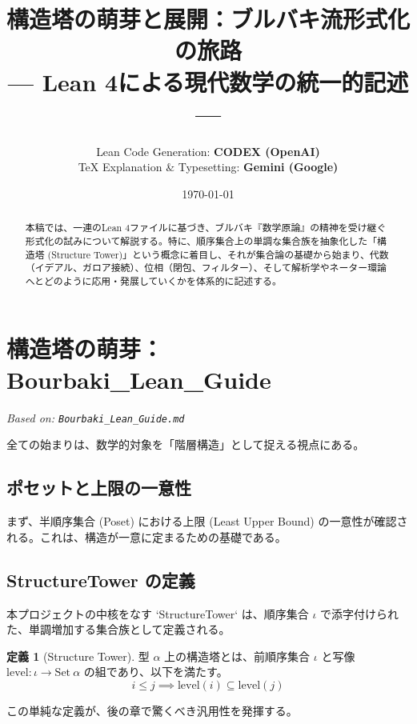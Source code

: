 \documentclass[a4paper,11pt]{ltjsarticle}
\title{\textbf{構造塔の萌芽と展開：ブルバキ流形式化の旅路} \\ \large --- Lean 4による現代数学の統一的記述 ---}
\author{
    Lean Code Generation: \textbf{CODEX (OpenAI)} \\
    TeX Explanation \& Typesetting: \textbf{Gemini (Google)}
}
\date{\today}
\theoremstyle{definition}
\newtheorem{definition}{定義}[section]
\begin{document}
\maketitle

\begin{abstract}
本稿では、一連のLean 4ファイルに基づき、ブルバキ『数学原論』の精神を受け継ぐ形式化の試みについて解説する。特に、順序集合上の単調な集合族を抽象化した「構造塔 (Structure Tower)」という概念に着目し、それが集合論の基礎から始まり、代数（イデアル、ガロア接続）、位相（閉包、フィルター）、そして解析学やネーター環論へとどのように応用・発展していくかを体系的に記述する。
\end{abstract}

\tableofcontents
\newpage

\section{構造塔の萌芽：Bourbaki\_Lean\_Guide}
\label{sec:bourbaki_guide}
\textit{Based on: \texttt{Bourbaki\_Lean\_Guide.md}}

全ての始まりは、数学的対象を「階層構造」として捉える視点にある。

\subsection{ポセットと上限の一意性}
まず、半順序集合 (Poset) における上限 (Least Upper Bound) の一意性が確認される。これは、構造が一意に定まるための基礎である。

\subsection{StructureTower の定義}
本プロジェクトの中核をなす `StructureTower` は、順序集合 $\iota$ で添字付けられた、単調増加する集合族として定義される。

\begin{definition}[Structure Tower]
型 $\alpha$ 上の構造塔とは、前順序集合 $\iota$ と写像 $\mathrm{level}: \iota \to \mathrm{Set}\ \alpha$ の組であり、以下を満たす。
\[ i \le j \implies \mathrm{level}(i) \subseteq \mathrm{level}(j) \]
\end{definition}

この単純な定義が、後の章で驚くべき汎用性を発揮する。
\end{document}
